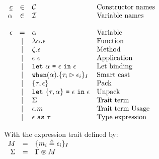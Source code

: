 \documentclass{article}[11pt]
\newcommand{\term}[1]{\verb~#1~}
\begin{document}
    \begin{math}
        \begin{array}{rclp{5cm}}
            \underline{c} & \in  & {\cal C}                                                                & Constructor names \\
            \alpha        & \in  & {\cal I}                                                                & Variable names    \\
            \\
            \epsilon & =
            & \alpha                                                                         & Variable              \\
            & \mid & \lambda \alpha . \epsilon                                               & Function              \\
            & \mid & \zeta . \epsilon                                                        & Method              \\
            & \mid & \epsilon ~ \epsilon                                                     & Application              \\
            & \mid & \term{let}~\alpha ~ \term{=} ~ \epsilon ~ \term{in} ~ \epsilon          & Let~binding              \\
            & \mid & \term{when}(\alpha).\{ \tau_i \rhd \epsilon_i \}_I                      & Smart cast              \\
            & \mid & \{\tau, \epsilon\}                                                      & Pack              \\
            & \mid & \term{let} ~ \{\tau, \alpha\} ~ \term{=} ~ \epsilon ~\term{in}~\epsilon & Unpack              \\
            & \mid & \Sigma                                                                  & Trait~term              \\
            & \mid & \epsilon . m                                                            & Trait~term~Usage              \\
            & \mid & \epsilon ~\term{as}~ \tau                                               & Type expression
        \end{array} \\
    \end{math}

    With the expression trait defined by: \\

    \begin{math}
        \begin{array}{rclp{5cm}}
            M      & = & \{ m_i \triangleq \epsilon_i \}_I \\
            \Sigma & = & \Gamma \circledast M              \\
        \end{array}
    \end{math}
\end{document}
